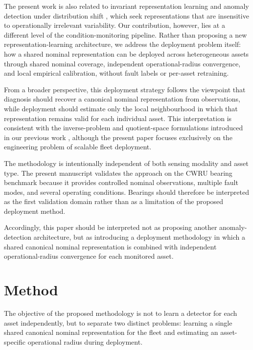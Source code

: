 \documentclass[11pt,a4paper]{article}
\begin{document}
The present work is also related to invariant representation learning
\cite{bronstein2021} and anomaly detection under distribution shift
\cite{li2023invariant}, which seek representations that are insensitive to operationally
irrelevant variability. Our contribution, however, lies at a different level of the
condition-monitoring pipeline. Rather than proposing a new representation-learning architecture,
we address the deployment problem itself: how a shared nominal representation can be deployed
across heterogeneous assets through shared nominal coverage, independent operational-radius
convergence, and local empirical calibration, without fault labels or per-asset retraining.

From a broader perspective, this deployment strategy follows the viewpoint that diagnosis should
recover a canonical nominal representation from observations, while deployment should estimate
only the local neighbourhood in which that representation remains valid for each individual
asset. This interpretation is consistent with the inverse-problem and quotient-space
formulations introduced in our previous work
\cite{disanti2026inverse,disanti2026quotient}, although the present paper focuses exclusively on
the engineering problem of scalable fleet deployment.

The methodology is intentionally independent of both sensing modality and asset type. The
present manuscript validates the approach on the CWRU bearing benchmark
\cite{smith2015} because it provides controlled nominal observations, multiple fault modes,
and several operating conditions. Bearings should therefore be interpreted as the first
validation domain rather than as a limitation of the proposed deployment method.

Accordingly, this paper should be interpreted not as proposing another anomaly-detection
architecture, but as introducing a deployment methodology in which a shared canonical nominal
representation is combined with independent operational-radius convergence for each monitored
asset.

\section{Method}
\label{sec:method}

The objective of the proposed methodology is not to learn a detector for each
asset independently, but to separate two distinct problems: learning a single
shared canonical nominal representation for the fleet and estimating an
asset-specific operational radius during deployment.
\end{document}

